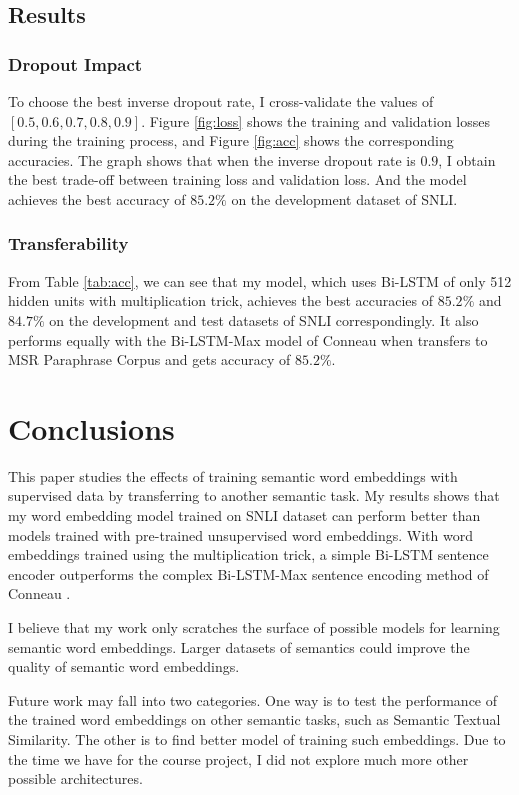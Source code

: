 \documentclass[10pt,twocolumn,letterpaper]{article}
\begin{document}
\subsection{Results}

\subsubsection{Dropout Impact}
To choose the best inverse dropout rate, I cross-validate the values of $[0.5, 0.6, 0.7, 0.8, 0.9]$. Figure \ref{fig:loss} shows the training and validation losses during the training process, and Figure \ref{fig:acc} shows the corresponding accuracies. The graph shows that when the inverse dropout rate is $0.9$, I obtain the best trade-off between training loss and validation loss. And the model achieves the best accuracy of $85.2\%$ on the development dataset of SNLI.

\subsubsection{Transferability}
From Table \ref{tab:acc}, we can see that my model, which uses Bi-LSTM of only 512 hidden units with multiplication trick, achieves the best accuracies of $85.2\%$ and $84.7\%$ on the development and test datasets of SNLI correspondingly. It also performs equally with the Bi-LSTM-Max model of Conneau \etal when transfers to MSR Paraphrase Corpus and gets accuracy of $85.2\%$.

\section{Conclusions}
This paper studies the effects of training semantic word embeddings with supervised data by transferring to another semantic task. My results shows that my word embedding model trained on SNLI dataset can perform better than models trained with pre-trained unsupervised word embeddings. With word embeddings trained using the multiplication trick, a simple Bi-LSTM sentence encoder outperforms the complex Bi-LSTM-Max sentence encoding method of Conneau \etal.

I believe that my work only scratches the surface of possible models for learning semantic word embeddings. Larger datasets of semantics could improve the quality of semantic word embeddings.

Future work may fall into two categories. One way is to test the performance of the trained word embeddings on other semantic tasks, such as Semantic Textual Similarity. The other is to find better model of training such embeddings. Due to the time we have for the course project, I did not explore much more other possible architectures.



\end{document}
